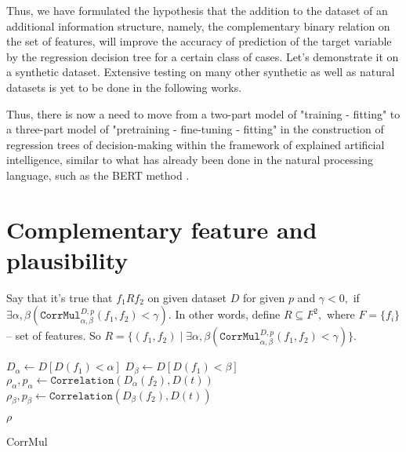 \documentclass[conference]{IEEEtran}
\begin{document}
Thus, we have formulated the hypothesis that the addition to the dataset of an additional information structure, namely, the complementary binary relation on the set of features, will improve the accuracy of prediction of the target variable by the regression decision tree for a certain class of cases. Let's demonstrate it on a synthetic dataset. Extensive testing on many other synthetic as well as natural datasets is yet to be done in the following works.


Thus, there is now a need to move from a two-part model of "training - fitting" to a three-part model of "pretraining - fine-tuning - fitting" in the construction of regression trees of decision-making within the framework of explained artificial intelligence, similar to what has already been done in the natural processing language, such as the BERT method \cite{BERT}.

\section{Complementary feature and plausibility}

Say that it's true that $f_1 R f_2$ on given dataset $D$ for given $p$ and $\gamma < 0,$ if $\exists\alpha,\beta(\texttt{CorrMul}_{\alpha,\beta}^{D,p}(f_1, f_2) < \gamma)$. In other words, define $R \subseteq F^2,$ where $F = \{f_i\}$  -- set of features. So $R = \{(f_1, f_2) \mid \exists\alpha,\beta(\texttt{CorrMul}_{\alpha,\beta}^{D,p}(f_1, f_2) < \gamma)\} $.

\begin{algorithm}
\SetAlgoLined
{}

$D_{\alpha} \gets D[D(f_1) < \alpha]$\;
$D_{\beta} \gets D[D(f_1) < \beta]$\;
$\rho_{\alpha}, p_{\alpha} \gets \texttt{Correlation}(D_{\alpha}(f_2), D(t)) $\;
$\rho_{\beta}, p_{\beta} \gets \texttt{Correlation}(D_{\beta}(f_2), D(t)) $\;

 \Return $\rho$
 \caption{CorrMul}
\end{algorithm}
\end{document}
